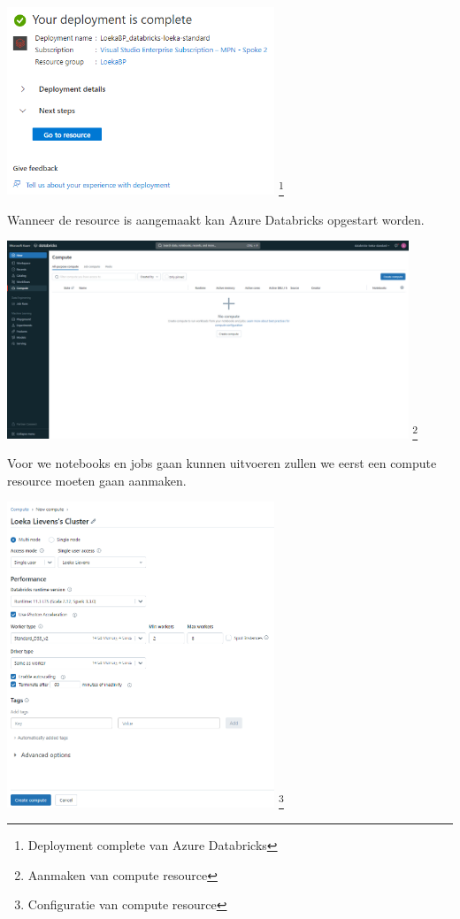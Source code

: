 \begin{center}
    \includegraphics[width=0.6\textwidth]{./graphics/databricks/initial_3.png}
    \footnote{Deployment complete van Azure Databricks}
\end{center}

Wanneer de resource is aangemaakt kan Azure Databricks opgestart worden.

\begin{center}
    \includegraphics[width=0.9\textwidth]{./graphics/databricks/initial_4.png}
    \footnote{Aanmaken van compute resource}
\end{center}

Voor we notebooks en jobs gaan kunnen uitvoeren zullen we eerst een compute resource moeten gaan aanmaken.

\begin{center}
    \includegraphics[width=0.6\textwidth]{./graphics/databricks/initial_5.png}
    \footnote{Configuratie van compute resource}
\end{center}

